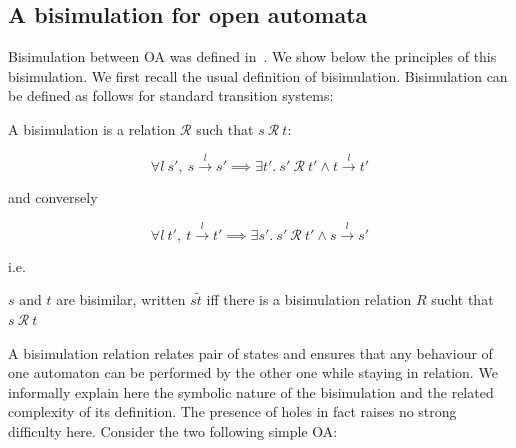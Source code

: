 \documentclass[runningheads]{llncs}
\begin{document}
\subsection{A bisimulation for open automata}

Bisimulation between OA was defined in~\cite{fhbisim}.  We show below the principles of this bisimulation. We first recall the usual definition of bisimulation.
Bisimulation can  be defined as follows for standard transition systems: 

\begin{definition}
  A bisimulation is a relation $\mathcal{R}$ such that $s~\mathcal{R}~t$:\\
  \begin{minipage}[c]{.6\textwidth}
    \[
      \forall l~s',~ {s}\xrightarrow{l}{s'}
      \implies
      \exists t'.~ s' ~\mathcal{R}~ t'
      \land {t}\xrightarrow{l}{t'}
    \]
    \begin{center}
      and conversely
    \end{center}
    \vspace{-1ex}
    \[
      \forall l~t',~ {t}\xrightarrow{l}{t'}
      \implies
      \exists s'.~ s' ~\mathcal{R}~ t'
      \land {s}\xrightarrow{l}{s'}
    \]
    \vspace{.5ex}
  \end{minipage}
  i.e. \qquad
  \begin{minipage}[c]{.35\textwidth}
  \end{minipage}
$s$ and $t$ are bisimilar, written $s\tilde t$ iff there is a bisimulation relation $R$ sucht that  $s ~\mathcal{R}~ t$
\end{definition}

A  bisimulation relation  relates pair of states and ensures that any behaviour of one automaton can be performed by the other one while staying in relation. We informally explain here the symbolic nature of the bisimulation and the related complexity of its definition. The presence of holes in fact raises no strong difficulty here.
Consider the two following simple OA:
\end{document}
